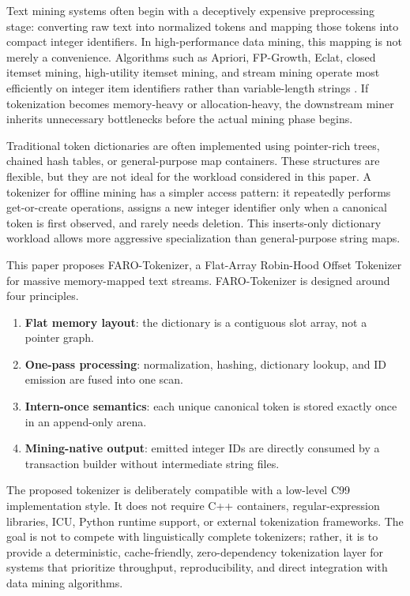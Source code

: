 \documentclass[11pt,a4paper]{article}
\begin{document}
Text mining systems often begin with a deceptively expensive preprocessing stage: converting raw text into normalized tokens and mapping those tokens into compact integer identifiers. In high-performance data mining, this mapping is not merely a convenience. Algorithms such as Apriori, FP-Growth, Eclat, closed itemset mining, high-utility itemset mining, and stream mining operate most efficiently on integer item identifiers rather than variable-length strings \cite{AgrawalSrikant1994,HanPeiYin2000,Zaki2000,FournierViger2014SPMF}. If tokenization becomes memory-heavy or allocation-heavy, the downstream miner inherits unnecessary bottlenecks before the actual mining phase begins.

Traditional token dictionaries are often implemented using pointer-rich trees, chained hash tables, or general-purpose map containers. These structures are flexible, but they are not ideal for the workload considered in this paper. A tokenizer for offline mining has a simpler access pattern: it repeatedly performs get-or-create operations, assigns a new integer identifier only when a canonical token is first observed, and rarely needs deletion. This inserts-only dictionary workload allows more aggressive specialization than general-purpose string maps.

This paper proposes FARO-Tokenizer, a Flat-Array Robin-Hood Offset Tokenizer for massive memory-mapped text streams. FARO-Tokenizer is designed around four principles.

\begin{enumerate}[label=(\arabic*)]
\item \textbf{Flat memory layout}: the dictionary is a contiguous slot array, not a pointer graph.
\item \textbf{One-pass processing}: normalization, hashing, dictionary lookup, and ID emission are fused into one scan.
\item \textbf{Intern-once semantics}: each unique canonical token is stored exactly once in an append-only arena.
\item \textbf{Mining-native output}: emitted integer IDs are directly consumed by a transaction builder without intermediate string files.
\end{enumerate}

The proposed tokenizer is deliberately compatible with a low-level C99 implementation style. It does not require C++ containers, regular-expression libraries, ICU, Python runtime support, or external tokenization frameworks. The goal is not to compete with linguistically complete tokenizers; rather, it is to provide a deterministic, cache-friendly, zero-dependency tokenization layer for systems that prioritize throughput, reproducibility, and direct integration with data mining algorithms.
\end{document}
